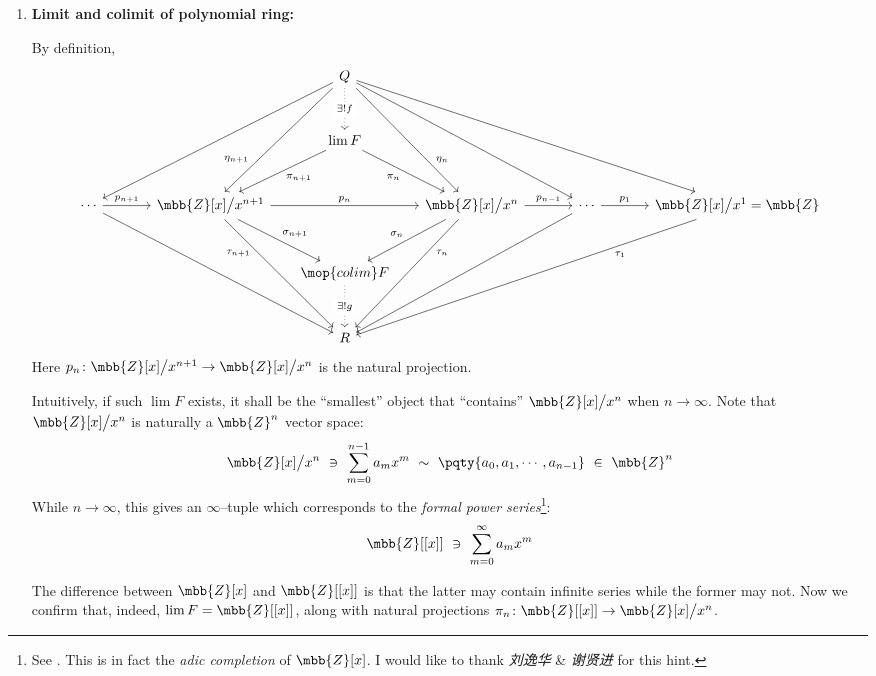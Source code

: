 \documentclass[a4paper,10pt]{article}
\newcommand{\Zpoly}[1]{\mbb{Z}[x]\big/x^{#1}}
\newcommand{\colim}{\mop{colim}}
\begin{document}
\begin{enumerate}
	\item \textbf{Limit and colimit of polynomial ring:}
	
	By definition,
	\begin{equation}
	\begin{tikzcd}[row sep=7ex,column sep=8ex,baseline=-.8ex]
		&&[-4ex] Q
			\arrow[ddll]
			\arrow[ddl,"\eta_{n+1}" near end,swap]
			\arrow[ddr,"\eta_{n}" near end]
			\arrow[ddrr]
			\arrow[ddrrr]
			\arrow[d,dotted,"\exists! f" description]
		&[-4ex] && \\
		&& \lim F
			\arrow[dl,"\pi_{n+1}"]
			\arrow[dr,"\pi_{n}",swap]
		&&& \\
		\cdots
			\arrow[ddrr]
			\arrow[r,"p_{n+1}"] &
		\Zpoly{n+1}
			\arrow[dr,"\sigma_{n+1}"]
			\arrow[ddr,
				"\tau_{n+1}\!" near start,swap]
			\arrow[rr,"p_n"] 
		&&
		\Zpoly{n}
			\arrow[dl,"\sigma_{n}",swap]
			\arrow[ddl,
				"\tau_{n}" near start]
			\arrow[r,"p_{n-1}"] &
		\cdots
			\arrow[ddll]
			\arrow[r,"p_1"] &
		\Zpoly{1} = \mbb{Z}
			\arrow[ddlll,
				"\tau_1" near start] \\
		&& \colim F
			\arrow[d,dotted,"\exists! g" description]
		&&& \\
		&& R
		&&&
	\end{tikzcd}
	\label{eq:polynomial_ring_tower}
	\end{equation}
	Here $p_n\colon\Zpoly{n+1}\to\Zpoly{n}$ is the natural projection. 
	
	Intuitively, if such $\lim F$ exists, it shall be the ``smallest'' object that ``contains'' $\Zpoly{n}$ when $n\to\infty$. Note that $\Zpoly{n}$ is naturally a $\mbb{Z}^n$ vector space:
	\begin{equation}
		\Zpoly{n}\ \ni\ \sum_{m=0}^{n-1} a_m x^m
		\ \sim\ \pqty{
			a_0, a_1, \cdots, a_{n-1}
		}\ \in\ \mbb{Z}^n
	\end{equation}
	While $n\to\infty$, this gives an $\infty$--tuple which corresponds to the \textit{formal power series}\footnote{
		See . This is in fact the \textit{adic completion} of $\mbb{Z}[x]$. I would like to thank \mbox{\textit{刘逸华}} \& \textit{谢贤进} for this hint. 
	}: 
	\begin{equation}
		\mbb{Z}[[x]] \ \ni\ \sum_{m=0}^\infty
			a_m x^m
	\end{equation}
	
	The difference between $\mbb{Z}[x]$ and $\mbb{Z}[[x]]$ is that the latter may contain infinite series while the former may not. Now we confirm that, indeed, $\lim F = \mbb{Z}[[x]]$, along with natural projections $
		\pi_n\colon\mbb{Z}[[x]]\to\Zpoly{n}
	$. 
	

\end{enumerate}
\end{document}
